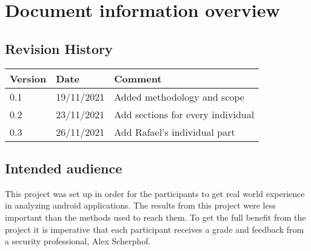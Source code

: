 \section*{Document information overview}
\subsection*{Revision History}

\begin{tabularx}{\textwidth}{|l|l|X|}
  \hline
  \textbf{Version} & \textbf{Date} & \textbf{Comment}                  \\ \hline
  0.1              & 19/11/2021    & Added methodology and scope       \\ \hline
  0.2              & 23/11/2021    & Add sections for every individual \\ \hline
  0.3              & 26/11/2021    & Add Rafael's individual part      \\ \hline
\end{tabularx}

\subsection*{Intended audience}

This project was set up in order for the participants to get real world experience in analyzing android applications.
The results from this project were less important than the methods used to reach them.
To get the full benefit from the project it is imperative that each participant receives a grade and feedback from a security professional, Alex Scherphof.

\newpage

